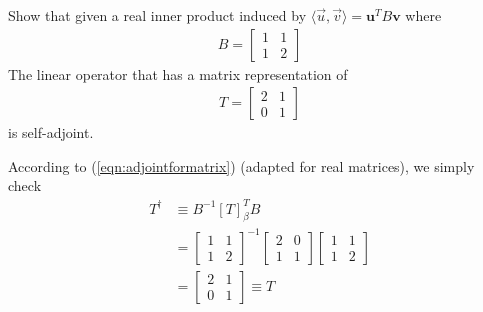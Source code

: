 \begin{Exercise}
Show that given a real inner product induced by $\langle \vec{u},\vec{v} \rangle = \textbf{u}^TB\textbf{v}$ where
\begin{align*}
B = 
\begin{bmatrix}
1 & 1 \\
1 & 2
\end{bmatrix}
\end{align*}
The linear operator that has a matrix representation of
\begin{align*}
T = 
\begin{bmatrix}
2 & 1 \\
0 & 1
\end{bmatrix}
\end{align*}
is self-adjoint.
\end{Exercise}
\begin{Answer}
According to (\ref{eqn:adjointformatrix}) (adapted for real matrices), we simply check
\begin{align*}
T^\dag &\equiv B^{-1} [T]_\beta^T B \\
&= \begin{bmatrix}
1 & 1 \\
1 & 2
\end{bmatrix}^{-1}
\begin{bmatrix}
2 & 0 \\
1 & 1
\end{bmatrix}
\begin{bmatrix}
1 & 1 \\
1 & 2
\end{bmatrix} \\
&= \begin{bmatrix}
2 & 1 \\
0 & 1
\end{bmatrix} \equiv T
\end{align*}
\end{Answer}

